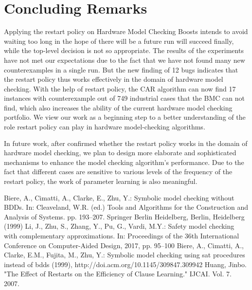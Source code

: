 \section{Concluding Remarks}
Applying the restart policy on Hardware Model Checking Boosts intends to avoid waiting too long in the hope of there will be a future run will succeed finally, while the top-level decision is not so appropriate. The results of the experiments have not met our expectations due to the fact that we have not found many new counterexamples in a single run. But the new finding of 12 bugs indicates that the restart policy thus works effectively in the domain of hardware model checking. With the help of restart policy, the CAR algorithm can now find 17 instances with counterexample out of 749 industrial cases that the BMC can not find, which also increases the ability of the current hardware model checking portfolio. We view our work as a beginning step to a better understanding of the role restart policy can play in hardware model-checking algorithms.

In future work, after confirmed whether the restart policy works in the domain of hardware model checking, we plan to design more elaborate and sophisticated mechanisms to enhance the model checking algorithm's performance. Due to the fact that different cases are sensitive to various levels of the frequency of the restart policy, the work of parameter learning is also meaningful.


\begin{thebibliography}{00}
 Biere, A., Cimatti, A., Clarke, E., Zhu, Y.: Symbolic model checking without BDDs. In: Cleaveland, W.R. (ed.) Tools and Algorithms for the Construction and Analysis of Systems. pp. 193–207. Springer Berlin Heidelberg, Berlin, Heidelberg (1999)
 Li, J., Zhu, S., Zhang, Y., Pu, G., Vardi, M.Y.: Safety model checking with complementary approximations. In: Proceedings of the 36th International Conference on Computer-Aided Design, 2017, pp. 95–100
 Biere, A., Cimatti, A., Clarke, E.M., Fujita, M., Zhu, Y.: Symbolic model checking using sat procedures instead of bdds (1999), http://doi.acm.org/10.1145/309847.309942
 Huang, Jinbo. "The Effect of Restarts on the Efficiency of Clause Learning." IJCAI. Vol. 7. 2007.


\end{thebibliography}
